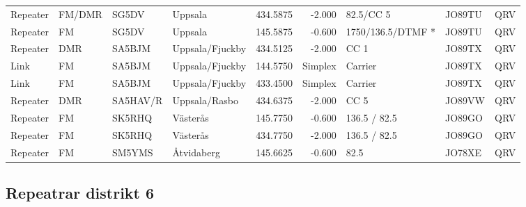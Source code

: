 \begin{landscape}
\begin{longtable}{llllrrlll}
	Repeater          & FM/DMR     & SG5DV    & Uppsala              &     434.5875 &     -2.000 & 82.5/CC 5         & JO89TU      & QRV      \\
	Repeater          & FM         & SG5DV    & Uppsala              &     145.5875 &     -0.600 & 1750/136.5/DTMF * & JO89TU      & QRV      \\
	Repeater          & DMR        & SA5BJM   & Uppsala/Fjuckby      &     434.5125 &     -2.000 & CC 1              & JO89TX      & QRV      \\
	Link              & FM         & SA5BJM   & Uppsala/Fjuckby      &     144.5750 &    Simplex & Carrier           & JO89TX      & QRV      \\
	Link              & FM         & SA5BJM   & Uppsala/Fjuckby      &     433.4500 &    Simplex & Carrier           & JO89TX      & QRV      \\
	Repeater          & DMR        & SA5HAV/R & Uppsala/Rasbo        &     434.6375 &     -2.000 & CC 5              & JO89VW      & QRV      \\
	Repeater          & FM         & SK5RHQ   & Västerås             &     145.7750 &     -0.600 & 136.5 / 82.5      & JO89GO      & QRV      \\
	Repeater          & FM         & SK5RHQ   & Västerås             &     434.7750 &     -2.000 & 136.5 / 82.5      & JO89GO      & QRV      \\
	Repeater          & FM         & SM5YMS   & Åtvidaberg           &     145.6625 &     -0.600 & 82.5              & JO78XE      & QRV
\end{longtable}


\clearpage

\subsection{Repeatrar distrikt 6}



\end{landscape}
